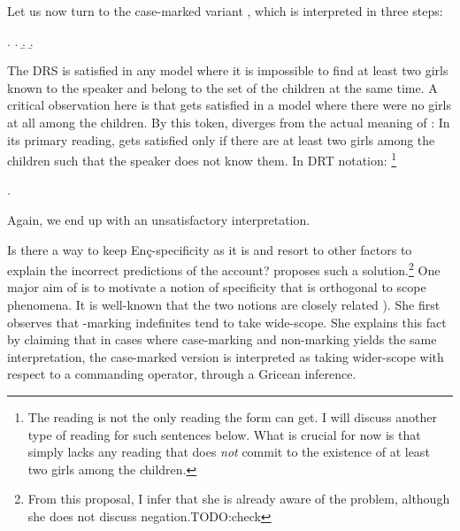 \documentclass[11pt,a4paper]{article}
\newcommand{\encspec}{Enç-specific}
\begin{document}
Let us now turn to the case-marked variant , which is
interpreted in three steps:

\ex.
\a.
\b.
\b.\label{Exencnegaccdrs}

The DRS  is satisfied in any model where it is impossible
to find at least two girls known to the speaker and belong to the set of the
children at the same time. A critical observation here is that
 gets satisfied in a model where there were no girls at
all among the children. By this token,  diverges from the
actual meaning of : In its primary reading,
 gets satisfied only if there are  at least two girls among
the children such that the speaker does not know them. In DRT notation:
\footnote{The reading  is not the only reading the form
 can get. I will discuss another type of reading for such
sentences below. What is crucial for now is that  simply
lacks any reading that does \emph{not} commit to the existence of at least two
girls among the children.}


\ex.\label{Exencwide}

Again, we end up with an unsatisfactory interpretation.

Is there a way to keep \encspec ity as it is and resort to other factors to
explain the incorrect predictions of the account?  proposes such a
solution.\footnote{From this proposal, I infer that she is already aware of the
problem, although she does not discuss negation.TODO:check} One major aim of
 is to motivate a notion of specificity that is orthogonal to scope
phenomena. It is well-known that the two notions are closely related
). She first observes that \acc-marking indefinites tend to
take wide-scope. She explains this fact by claiming that in cases where
case-marking and non-marking yields the same interpretation, the case-marked
version is interpreted as taking wider-scope with respect to a commanding
operator, through a Gricean inference.
\end{document}
